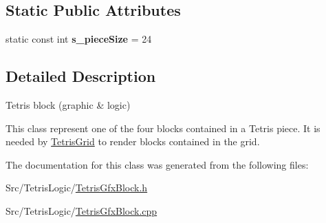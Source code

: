 \subsection*{Static Public Attributes}
\begin{DoxyCompactItemize}
\item 
\hypertarget{classTetrisGfxBlock_a94f3fbfe78156ad8285ce50ea1bdd656}{static const int {\bfseries s\-\_\-piece\-Size} = 24}\label{classTetrisGfxBlock_a94f3fbfe78156ad8285ce50ea1bdd656}

\end{DoxyCompactItemize}


\subsection{Detailed Description}
Tetris block (graphic \& logic) 

This class represent one of the four blocks contained in a Tetris piece. It is needed by \hyperlink{classTetrisGrid}{Tetris\-Grid} to render blocks contained in the grid. 

The documentation for this class was generated from the following files\-:\begin{DoxyCompactItemize}
\item 
Src/\-Tetris\-Logic/\hyperlink{TetrisGfxBlock_8h}{Tetris\-Gfx\-Block.\-h}\item 
Src/\-Tetris\-Logic/\hyperlink{TetrisGfxBlock_8cpp}{Tetris\-Gfx\-Block.\-cpp}\end{DoxyCompactItemize}
